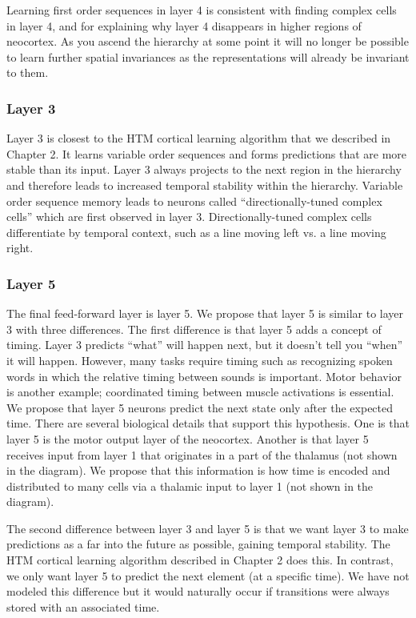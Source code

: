 \documentclass{report}
\begin{document}
Learning first order sequences in layer 4 is consistent with finding
complex cells in layer 4, and for explaining why layer 4 disappears in
higher regions of neocortex. As you ascend the hierarchy at some point
it will no longer be possible to learn further spatial invariances as
the representations will already be invariant to them.

\subsubsection*{Layer 3}
Layer 3 is closest to the HTM cortical learning algorithm that we
described in Chapter 2. It learns variable order sequences and forms
predictions that are more stable than its input. Layer 3 always
projects to the next region in the hierarchy and therefore leads to
increased temporal stability within the hierarchy. Variable order
sequence memory leads to neurons called ``directionally-tuned complex
cells'' which are first observed in layer 3. Directionally-tuned
complex cells differentiate by temporal context, such as a line moving
left vs. a line moving right.

\subsubsection*{Layer 5}
The final feed-forward layer is layer 5. We propose that layer 5 is
similar to layer 3 with three differences. The first difference is
that layer 5 adds a concept of timing. Layer 3 predicts ``what'' will
happen next, but it doesn't tell you ``when'' it will happen. However,
many tasks require timing such as recognizing spoken words in which
the relative timing between sounds is important. Motor behavior is
another example; coordinated timing between muscle activations is
essential. We propose that layer 5 neurons predict the next state only
after the expected time. There are several biological details that
support this hypothesis. One is that layer 5 is the motor output layer
of the neocortex. Another is that layer 5 receives input from layer 1
that originates in a part of the thalamus (not shown in the
diagram). We propose that this information is how time is encoded and
distributed to many cells via a thalamic input to layer 1 (not shown
in the diagram).

The second difference between layer 3 and layer 5 is that we want
layer 3 to make predictions as a far into the future as possible,
gaining temporal stability. The HTM cortical learning algorithm
described in Chapter 2 does this. In contrast, we only want layer 5 to
predict the next element (at a specific time). We have not modeled
this difference but it would naturally occur if transitions were
always stored with an associated time.
\end{document}
